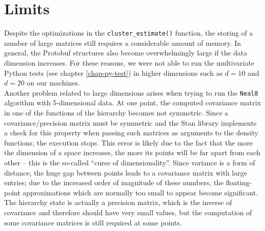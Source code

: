 \section{Limits}
Despite the optimizations in the \verb|cluster_estimate()| function, the storing of a number of large matrices still requires a considerable amount of memory.
In general, the Protobuf structures also become overwhelmingly large if the data dimension increases.
For these reasons, we were not able to run the multivariate Python tests (see chapter \ref{chap-py-test}) in higher dimensions such as $d=10$ and $d=20$ on our machines. \\
Another problem related to large dimensions arises when trying to run the \verb|Neal8| algorithm with 5-dimensional data.
At one point, the computed covariance matrix in one of the functions of the hierarchy becomes not symmetric.
Since a covariance/precision matrix must be symmetric and the Stan library implements a check for this property when passing such matrices as arguments to the density functions, the execution stops.
This error is likely due to the fact that the more the dimension of a space increases, the more its points will be far apart from each other -- this is the so-called ``curse of dimensionality''.
Since variance is a form of distance, the huge gap between points leads to a covariance matrix with large entries; due to the increased order of magnitude of these numbers, the floating-point approximations which are normally too small to appear become significant.
The hierarchy state is actually a precision matrix, which is the inverse of covariance and therefore should have very small values, but the computation of some covariance matrices is still required at some points.
